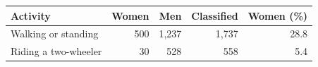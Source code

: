 \begin{tabular}{lrrrr}
\toprule
Activity & Women & Men & Classified & Women (\%) \\
\midrule
Walking or standing & 500 & 1,237 & 1,737 & 28.8 \\
Riding a two-wheeler & 30 & 528 & 558 & 5.4 \\
\bottomrule
\end{tabular}
